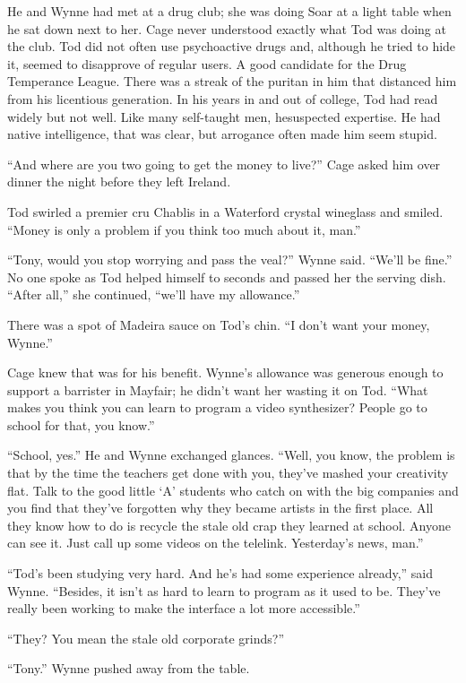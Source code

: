 He and Wynne had met at a drug club; she was doing Soar at a light table when he sat down next to her. Cage never understood exactly what Tod was doing at the club. Tod did not often use psychoactive drugs and, although he tried to hide it, seemed to disapprove of regular users. A good candidate for the Drug Temperance League. There was a streak of the puritan in him that distanced him from his licentious generation. In his years in and out of college, Tod had read widely but not well. Like many self-taught men, hesuspected expertise. He had native intelligence, that was clear, but arrogance often made him seem stupid.

“And where are you two going to get the money to live?” Cage asked him over dinner the night before they left Ireland.

Tod swirled a premier cru Chablis in a Waterford crystal wineglass and smiled. “Money is only a problem if you think too much about it, man.”

“Tony, would you stop worrying and pass the veal?” Wynne said. “We’ll be fine.” No one spoke as Tod helped himself to seconds and passed her the serving dish. “After all,” she continued, “we’ll have my allowance.”

There was a spot of Madeira sauce on Tod’s chin. “I don’t want your money, Wynne.”

Cage knew that was for his benefit. Wynne’s allowance was generous enough to support a barrister in Mayfair; he didn’t want her wasting it on Tod. “What makes you think you can learn to program a video synthesizer? People go to school for that, you know.”

“School, yes.” He and Wynne exchanged glances. “Well, you know, the problem is that by the time the teachers get done with you, they’ve mashed your creativity flat. Talk to the good little ‘A’ students who catch on with the big companies and you find that they’ve forgotten why they became artists in the first place. All they know how to do is recycle the stale old crap they learned at school. Anyone can see it. Just call up some videos on the telelink. Yesterday’s news, man.”

“Tod’s been studying very hard. And he’s had some experience already,” said Wynne. “Besides, it isn’t as hard to learn to program as it used to be. They’ve really been working to make the interface a lot more accessible.”

“They? You mean the stale old corporate grinds?”

“Tony.” Wynne pushed away from the table.

